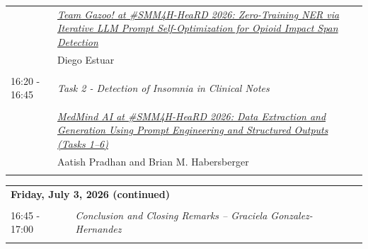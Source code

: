 \documentclass[11pt,oneside]{book}
\begin{document}
\begin{tabular}{p{24mm}p{124mm}}
                
                      & \hyperlink{page.28}{\emph{Team Gazoo! at \#SMM4H-HeaRD 2026: Zero-Training NER via Iterative LLM Prompt Self-Optimization for Opioid Impact Span Detection}}\\
        & Diego Estuar\index{Estuar}\\\\
                      16:20 - 16:45 & \emph{Task 2 - Detection of Insomnia in Clinical Notes}\\\\
      
                
                      & \hyperlink{page.187}{\emph{MedMind AI at \#SMM4H-HeaRD 2026: Data Extraction and Generation Using Prompt Engineering and Structured Outputs (Tasks 1–6)}}\\
        & Aatish Pradhan\index{Pradhan} and Brian M. Habersberger\index{Habersberger}\\\\
              \end{tabular}
    \newpage
          \begin{tabular}{p{24mm}p{124mm}}
    \multicolumn{2}{l}{\bf Friday, July 3, 2026 (continued)} \\\\
                16:45 - 17:00 & \emph{Conclusion and Closing Remarks -- Graciela Gonzalez-Hernandez}\\\\
      
              \end{tabular}
    \newpage
      
\end{document}

